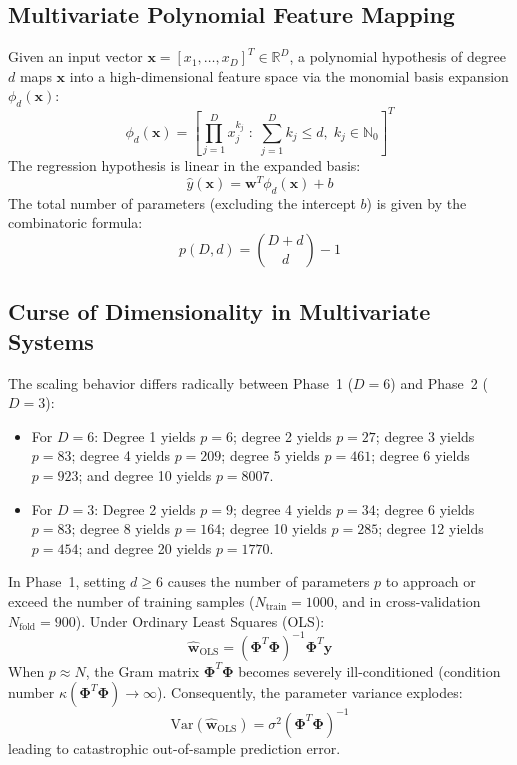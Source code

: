 \documentclass[10pt,twocolumn]{article}
\begin{document}
\subsection{Multivariate Polynomial Feature Mapping}
Given an input vector $\mathbf{x} = [x_1, \dots, x_D]^T \in \mathbb{R}^D$, a polynomial hypothesis of degree $d$ maps $\mathbf{x}$ into a high-dimensional feature space via the monomial basis expansion $\phi_d(\mathbf{x})$:
\begin{equation}
\phi_d(\mathbf{x}) = \left[ \prod_{j=1}^D x_j^{k_j} \;:\; \sum_{j=1}^D k_j \le d, \; k_j \in \mathbb{N}_0 \right]^T
\end{equation}
The regression hypothesis is linear in the expanded basis:
\begin{equation}
\hat{y}(\mathbf{x}) = \mathbf{w}^T \phi_d(\mathbf{x}) + b
\end{equation}
The total number of parameters (excluding the intercept $b$) is given by the combinatoric formula:
\begin{equation}
p(D, d) = \binom{D + d}{d} - 1
\end{equation}

\subsection{Curse of Dimensionality in Multivariate Systems}
The scaling behavior differs radically between Phase~1 ($D=6$) and Phase~2 ($D=3$):
\begin{itemize}\setlength{\itemsep}{1pt}
    \item For $D=6$: Degree 1 yields $p=6$; degree 2 yields $p=27$; degree 3 yields $p=83$; degree 4 yields $p=209$; degree 5 yields $p=461$; degree 6 yields $p=923$; and degree 10 yields $p=8007$.
    \item For $D=3$: Degree 2 yields $p=9$; degree 4 yields $p=34$; degree 6 yields $p=83$; degree 8 yields $p=164$; degree 10 yields $p=285$; degree 12 yields $p=454$; and degree 20 yields $p=1770$.
\end{itemize}

In Phase~1, setting $d \ge 6$ causes the number of parameters $p$ to approach or exceed the number of training samples ($N_{\text{train}}=1000$, and in cross-validation $N_{\text{fold}}=900$). Under Ordinary Least Squares (OLS):
\begin{equation}
\hat{\mathbf{w}}_{\text{OLS}} = (\boldsymbol{\Phi}^T \boldsymbol{\Phi})^{-1} \boldsymbol{\Phi}^T \mathbf{y}
\end{equation}
When $p \approx N$, the Gram matrix $\boldsymbol{\Phi}^T \boldsymbol{\Phi}$ becomes severely ill-conditioned (condition number $\kappa(\boldsymbol{\Phi}^T \boldsymbol{\Phi}) \to \infty$). Consequently, the parameter variance explodes:
\begin{equation}
\text{Var}(\hat{\mathbf{w}}_{\text{OLS}}) = \sigma^2 (\boldsymbol{\Phi}^T \boldsymbol{\Phi})^{-1}
\end{equation}
leading to catastrophic out-of-sample prediction error.
\end{document}
